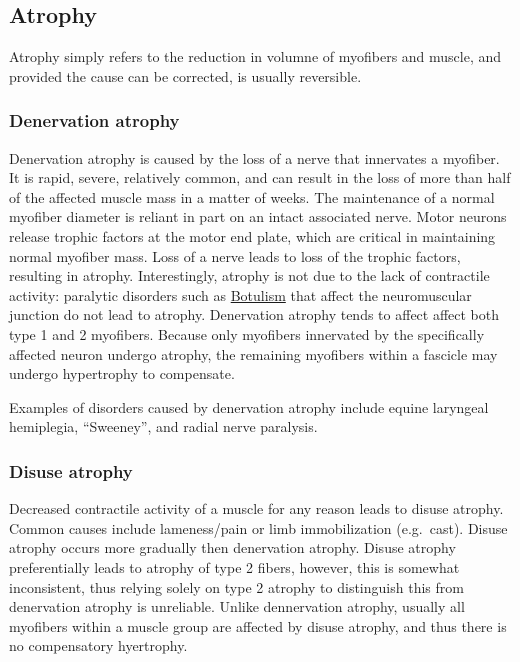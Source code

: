 \documentclass[openany]{book}
\begin{document}
\subsection{Atrophy}\label{atrophy}

Atrophy simply refers to the reduction in volumne of myofibers and
muscle, and provided the cause can be corrected, is usually reversible.

\subsubsection{Denervation atrophy}\label{denervation-atrophy}

Denervation atrophy is caused by the loss of a nerve that innervates a
myofiber. It is rapid, severe, relatively common, and can result in the
loss of more than half of the affected muscle mass in a matter of weeks.
The maintenance of a normal myofiber diameter is reliant in part on an
intact associated nerve. Motor neurons release trophic factors at the
motor end plate, which are critical in maintaining normal myofiber mass.
Loss of a nerve leads to loss of the trophic factors, resulting in
atrophy. Interestingly, atrophy is not due to the lack of contractile
activity: paralytic disorders such as
\protect\hyperlink{botulism}{Botulism} that affect the neuromuscular
junction do not lead to atrophy. Denervation atrophy tends to affect
affect both type 1 and 2 myofibers. Because only myofibers innervated by
the specifically affected neuron undergo atrophy, the remaining
myofibers within a fascicle may undergo hypertrophy to compensate.

Examples of disorders caused by denervation atrophy include equine
laryngeal hemiplegia, ``Sweeney'', and radial nerve paralysis.

\subsubsection{Disuse atrophy}\label{disuse-atrophy}

Decreased contractile activity of a muscle for any reason leads to
disuse atrophy. Common causes include lameness/pain or limb
immobilization (e.g.~cast). Disuse atrophy occurs more gradually then
denervation atrophy. Disuse atrophy preferentially leads to atrophy of
type 2 fibers, however, this is somewhat inconsistent, thus relying
solely on type 2 atrophy to distinguish this from denervation atrophy is
unreliable. Unlike dennervation atrophy, usually all myofibers within a
muscle group are affected by disuse atrophy, and thus there is no
compensatory hyertrophy.
\end{document}

